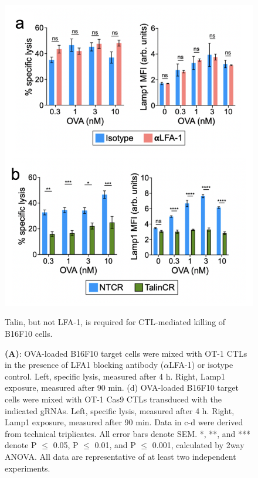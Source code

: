 \begin{figure}[htbp]
	\centering
	\includegraphics[width=1.0\columnwidth]{../figures/chapter3/fig5assays.png}
	\caption{Talin, but not LFA-1, is required for CTL-mediated killing of B16F10 cells.}
	\caption*{\textbf{(A)}: OVA-loaded B16F10 target cells were mixed with OT-1 CTLs in the presence of LFA1 blocking antibody ($\alpha$LFA-1) or isotype control. Left, specific lysis, measured after 4 h. Right, Lamp1 exposure, measured after 90 min. (d) OVA-loaded B16F10 target cells were mixed with OT-1 Cas9 CTLs transduced with the indicated gRNAs. Left, specific lysis, measured after 4 h. Right, Lamp1 exposure, measured after 90 min. Data in c-d were derived from technical triplicates. All error bars denote SEM. *, **, and *** denote P $\leq$ 0.05, P $\leq$ 0.01, and P $\leq$ 0.001, calculated by 2way ANOVA. All data are representative of at least two independent experiments.}
	\label{fig:fig5assays}
\end{figure} 

